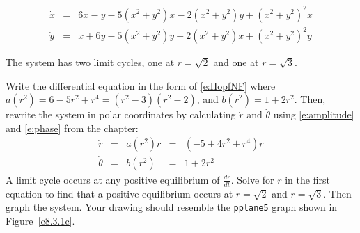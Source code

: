 \documentclass{ximera}
\begin{document}
\begin{exercise} \label{c8.3.1c}
\[ 
\begin{array}{rcl}
\dot{x} & = &  6x-y - 5(x^2+y^2)x - 2(x^2+y^2)y + (x^2+y^2)^2x\\
\dot{y} & = &  x+6y - 5(x^2+y^2)y + 2(x^2+y^2)x + (x^2+y^2)^2y
\end{array}
\]

\begin{solution}

\ans The system has two limit cycles, one at $r = \sqrt{2}$ and one
at $r = \sqrt{3}$. 

\soln Write the differential equation in the form of \eqref{e:HopfNF}
where $a(r^2) = 6 - 5r^2 + r^4=(r^2-3)(r^2-2)$, and 
$b(r^2) = 1+2r^2$.  Then,
rewrite the system in polar coordinates by calculating $\dot{r}$ and
$\dot{\theta}$ using \eqref{e:amplitude} and \eqref{e:phase} from the
chapter:
\[ 
\begin{array}{rcccl}
\dot{r} & = & a(r^2)r & = & (-5 + 4r^2 + r^4)r \\
\dot{\theta} & = & b(r^2) & = & 1+2r^2 \end{array}
\]
A limit cycle occurs at any positive equilibrium of $\frac{dr}{dt}$.
Solve for $r$ in the first equation to find that a positive equilibrium 
occurs at $r = \sqrt{2}$ and $r = \sqrt{3}$.  Then graph the system.  Your 
drawing should resemble the {\tt pplane5} graph shown in Figure~\ref{c8.3.1c}.

\begin{figure}[htb]
                       \centerline{%
                       }
\end{figure}


\end{solution}
\end{exercise}
\end{document}

